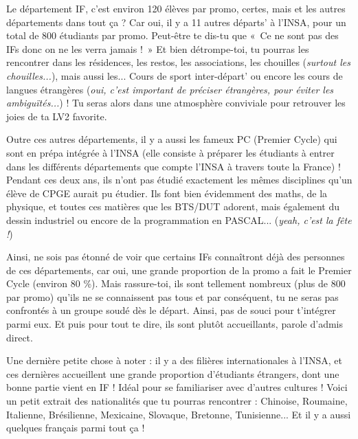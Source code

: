 Le département IF, c'est environ 120 élèves par promo, certes, mais et les autres départements dans tout ça ?
Car oui, il y a 11 autres départs' à l'INSA, pour un total de 800 étudiants par promo.
Peut-être te dis-tu que «~Ce ne sont pas des IFs donc on ne les verra jamais !~»
Et bien détrompe-toi, tu pourras les rencontrer dans les résidences, les restos,
les associations, les chouilles (\emph{surtout les chouilles...}), mais
aussi les... Cours de sport inter-départ' ou encore les cours de langues
étrangères (\emph{oui, c'est important de préciser étrangères, pour éviter les
ambiguïtés...}) ! Tu seras alors dans une atmosphère conviviale pour
retrouver les joies de ta LV2 favorite.

Outre ces autres départements, il y a aussi les fameux PC (Premier
Cycle) qui sont en prépa intégrée à l'INSA (elle consiste à préparer les
étudiants à entrer dans les différents départements que compte l'INSA à travers
toute la France) ! Pendant ces deux ans, ils n'ont pas étudié exactement les
mêmes disciplines qu'un élève de CPGE aurait pu étudier. Ils font bien
évidemment des maths, de la physique, et toutes ces matières que les BTS/DUT
adorent, mais également du dessin industriel ou encore de la programmation en
PASCAL... (\emph{yeah, c'est la fête !})


Ainsi, ne sois pas étonné de voir que certains IFs connaîtront déjà des
personnes de ces départements, car oui, une grande proportion de la promo a fait le Premier
Cycle (environ 80 \%). Mais rassure-toi, ils sont tellement nombreux  (plus de
800 par promo) qu'ils ne se connaissent pas tous et par conséquent, tu
ne seras pas confrontés à un groupe soudé dès le départ. Ainsi, pas de souci
pour t'intégrer parmi eux. Et puis pour tout te dire, ils sont plutôt
accueillants, parole d'admis direct.

Une dernière petite chose à noter : il y a des filières internationales à
l'INSA, et ces dernières accueillent une grande proportion d'étudiants étrangers, dont
une bonne partie vient en IF ! Idéal pour se familiariser avec d'autres
cultures ! Voici un petit extrait des nationalités que tu pourras rencontrer :
Chinoise, Roumaine, Italienne, Brésilienne, Mexicaine, Slovaque, Bretonne,
Tunisienne... Et il y a aussi quelques français parmi tout ça !
